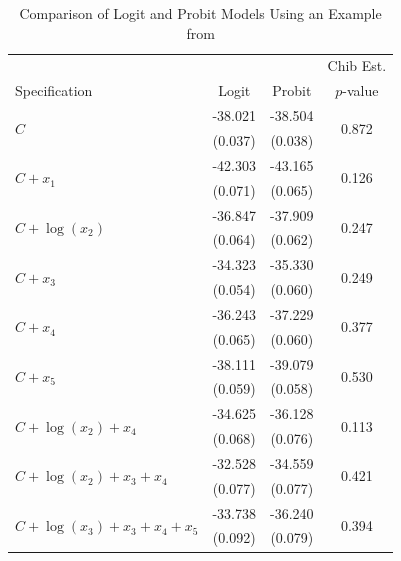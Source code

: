 \documentclass[twocolumn]{article}
\begin{document}
\begin{table}
	\centering
	\begin{tabular}{l|c|c|c}
		& & & Chib Est. \\
		Specification & Logit & Probit & $p$-value \\
		\hline \hline
		\multirow{2}{*}{$C$} & -38.021 & -38.504 & \multirow{2}{*}{0.872} \\
		& (0.037) & (0.038) & \\ \hline
		\multirow{2}{*}{$C + x_1$} & -42.303 & -43.165 & \multirow{2}{*}{0.126} \\
		& (0.071) & (0.065) & \\ \hline
		\multirow{2}{*}{$C + \log(x_2)$} & -36.847 & -37.909 & \multirow{2}{*}{0.247} \\
		& (0.064) & (0.062) & \\ \hline
		\multirow{2}{*}{$C + x_3$} & -34.323 & -35.330 & \multirow{2}{*}{0.249} \\
		& (0.054) & (0.060) & \\ \hline
		\multirow{2}{*}{$C + x_4$} & -36.243 & -37.229 & \multirow{2}{*}{0.377} \\
		& (0.065) & (0.060) & \\ \hline
		\multirow{2}{*}{$C + x_5$} & -38.111 & -39.079 & \multirow{2}{*}{0.530} \\
		& (0.059) & (0.058) & \\ \hline
		\multirow{2}{*}{$C + \log(x_2) + x_4$} & -34.625 & -36.128 & \multirow{2}{*}{0.113} \\
		& (0.068) & (0.076) & \\ \hline
		\multirow{2}{*}{$C + \log(x_2) + x_3 + x_4$} & -32.528 & -34.559 & \multirow{2}{*}{0.421} \\
		& (0.077) & (0.077) & \\ \hline
		\multirow{2}{*}{$C + \log(x_3) + x_3 + x_4 + x_5$} & -33.738 & -36.240 & \multirow{2}{*}{0.394} \\
		& (0.092) & (0.079) & \\ \hline
	\end{tabular}
	\caption{Comparison of Logit and Probit Models Using an Example from \cite{Chib}}
	\label{tab:Logit-Probit-Chib}
\end{table}
\end{document}
